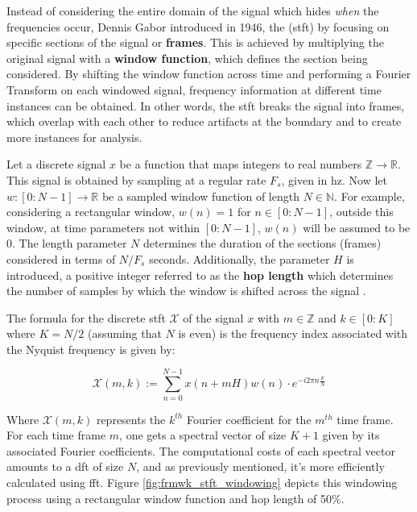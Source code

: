 Instead of considering the entire domain of the signal which hides \textit{when} the frequencies occur, Dennis Gabor introduced in 1946, the  (\gls{stft}) by focusing on specific sections of the signal or \textbf{frames}. This is achieved by multiplying the original signal with a \textbf{window function}, which defines the section being considered. By shifting the window function across time and performing a Fourier Transform on each windowed signal, frequency information at different time instances can be obtained. In other words, the \gls{stft} breaks the signal into frames, which overlap with each other to reduce artifacts at the boundary and to create more instances for analysis. 

Let a discrete signal $x$ be a function that maps integers to real numbers $\mathbb{Z} \rightarrow \mathbb{R}$. This signal is obtained by sampling at a regular rate $F_s$, given in \gls{hz}. Now let $w : [0:N - 1] \rightarrow \mathbb{R}$ be a sampled window function of length $N \in \mathbb{N}$. For example, considering a rectangular window, $w(n) = 1$ for $n \in [0:N - 1]$, outside this window, at time parameters not within $[0:N - 1]$, $w(n)$ will be assumed to be 0. The length parameter $N$ determines the duration of the sections (frames) considered in terms of $N/F_s$ seconds. Additionally, the parameter $H$ is introduced, a positive integer referred to as the \textbf{hop length} which determines the number of samples by which the window is shifted across the signal \cite{Mueller2021}.

The formula for the discrete \gls{stft} $\mathcal{X}$ of the signal $x$ with $m \in \mathbb{Z}$ and $k \in [0:K]$ where $K = N/2$ (assuming that $N$ is even) is the frequency index associated with the Nyquist frequency is given by:

\begin{equation}
    \label{eq:frmwk_stft_discrete_stft}
    \mathcal{X}(m, k):=\sum_{n=0}^{N-1} x(n+m H) w(n) \cdot e^{-i 2 \pi n \frac{k}{N}}
\end{equation}

Where $\mathcal{X}(m, k)$ represents the $k^{th}$ Fourier coefficient for the $m^{th}$ time frame. For each time frame $m$, one gets a spectral vector of size $K+1$ given by its associated Fourier coefficients. The computational costs of each spectral vector amounts to a \gls{dft} of size $N$, and as previously mentioned, it's more efficiently calculated using \gls{fft}. Figure \ref{fig:frmwk_stft_windowing} depicts this windowing process using a rectangular window function and hop length of 50\%.

